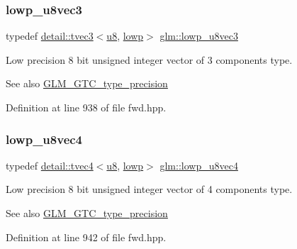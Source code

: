 \subsubsection{\texorpdfstring{lowp\+\_\+u8vec3}{lowp\_u8vec3}}
{\footnotesize\ttfamily typedef \hyperlink{structglm_1_1detail_1_1tvec3}{detail\+::tvec3}$<$\hyperlink{group__gtc__type__precision_ga5e3dc67373d5068997d2d9f41c9024d2}{u8}, \hyperlink{namespaceglm_a0f04f086094c747d227af4425893f545ae161af3fc695e696ce3bf69f7332bc2d}{lowp}$>$ \hyperlink{group__gtc__type__precision_gaf0d7154052c636edf4a902fc8a4a56f2}{glm\+::lowp\+\_\+u8vec3}}

Low precision 8 bit unsigned integer vector of 3 components type. \begin{DoxySeeAlso}{See also}
\hyperlink{group__gtc__type__precision}{G\+L\+M\+\_\+\+G\+T\+C\+\_\+type\+\_\+precision} 
\end{DoxySeeAlso}


Definition at line 938 of file fwd.\+hpp.

\mbox{\label{group__gtc__type__precision_ga98f82380862128fac9afae1b53840562}} 
\subsubsection{\texorpdfstring{lowp\+\_\+u8vec4}{lowp\_u8vec4}}
{\footnotesize\ttfamily typedef \hyperlink{structglm_1_1detail_1_1tvec4}{detail\+::tvec4}$<$\hyperlink{group__gtc__type__precision_ga5e3dc67373d5068997d2d9f41c9024d2}{u8}, \hyperlink{namespaceglm_a0f04f086094c747d227af4425893f545ae161af3fc695e696ce3bf69f7332bc2d}{lowp}$>$ \hyperlink{group__gtc__type__precision_ga98f82380862128fac9afae1b53840562}{glm\+::lowp\+\_\+u8vec4}}

Low precision 8 bit unsigned integer vector of 4 components type. \begin{DoxySeeAlso}{See also}
\hyperlink{group__gtc__type__precision}{G\+L\+M\+\_\+\+G\+T\+C\+\_\+type\+\_\+precision} 
\end{DoxySeeAlso}


Definition at line 942 of file fwd.\+hpp.

\mbox{\label{group__gtc__type__precision_ga9b8409887319f62f06e664f6ca121b9d}} 
